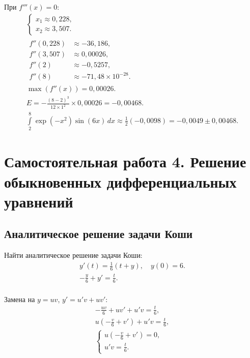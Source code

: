 \documentclass[10pt, a4paper, titlepage]{article}
\begin{document}
При $f'''(x) = 0$:
\begin{gather*}
    \begin{cases}
        x_1 \approx 0,228 ,\\
        x_2 \approx 3,507 .
    \end{cases} 
    \\
    \begin{aligned}
        f''(0,228) &\approx -36,186 ,\\
        f''(3,507) &\approx 0,00026 ,\\
        f''(2) &\approx -0,5257 ,\\
        f''(8) &\approx -71,48\times10^{-28} .
    \end{aligned}
    \\
    \max(f''(x))=0,00026 .\\
    E=-\frac{(8-2)^3}{12\times1^2}\times0,00026=-0,00468 .\\
    \int\limits_2^8 \exp(-x^2)\sin(6x)\,dx \approx \frac{1}{2}(-0,0098)=-0,0049\pm0,00468 .
\end{gather*}


\newpage
\section{Самостоятельная работа \textnumero{} 4. Решение обыкновенных дифференциальных уравнений}

\subsection*{Аналитическое решение задачи Коши}

Найти аналитическое решение задачи Коши:
\begin{gather*}
    y'(t)=\frac{1}{6}(t+y), \quad y(0)=6 .\\
    -\frac{y}{6}+y'=\frac{t}{6} .\\
\end{gather*}

Замена на $y=uv$, $y'=u'v+uv'$:
\begin{gather*}
    -\frac{uv}{6}+uv'+u'v=\frac{t}{6} ,\\
    u\left(-\frac{v}{6}+v'\right)+u'v = \frac{t}{6} ,\\
    \begin{cases}
        u\left(-\frac{v}{6}+v'\right)=0 ,\\
        u'v=\frac{t}{6} .
    \end{cases}
\end{gather*}
\end{document}
